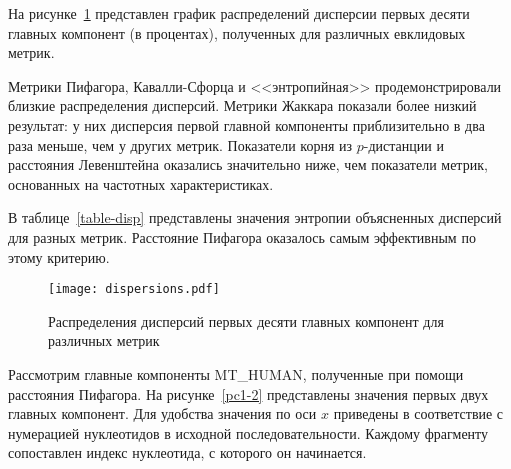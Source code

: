 На рисунке~\ref{dispersions} представлен график распределений дисперсии первых десяти главных компонент (в процентах), полученных для различных евклидовых метрик.

Метрики Пифагора, Кавалли-Сфорца и <<энтропийная>> продемонстрировали близкие распределения дисперсий. Метрики Жаккара показали более низкий результат: у них дисперсия первой главной компоненты приблизительно в два раза меньше, чем у других метрик. Показатели корня из $p$-дистанции и расстояния Левенштейна оказались значительно ниже, чем показатели метрик, основанных на частотных характеристиках.

В таблице~\ref{table-disp} представлены значения энтропии объясненных дисперсий для разных метрик. Расстояние Пифагора оказалось самым эффективным по этому критерию.

\begin{figure}[!t]
  \centering
  \texttt{[image: dispersions.pdf]}
  \caption{Распределения дисперсий первых десяти главных компонент для различных метрик}
  \label{dispersions}
\end{figure}

\begin{table}[h!]
  \caption{Энтропия распределения дисперсий главных компонент для различных евклидовых метрик}
  \label{table-disp}
\end{table}

Рассмотрим главные компоненты MT\_HUMAN, полученные при помощи расстояния Пифагора. На рисунке~\ref{pc1-2} представлены значения первых двух главных компонент. Для удобства значения по оси $x$ приведены в соответствие с нумерацией нуклеотидов в исходной последовательности. Каждому фрагменту сопоставлен индекс нуклеотида, с которого он начинается.

